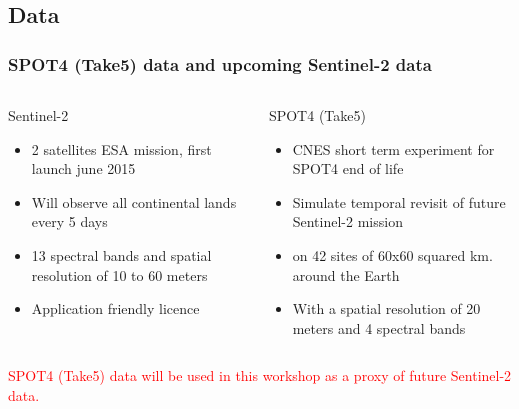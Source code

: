 \documentclass[8pt]{beamer}
\begin{document}
\subsection{Data}
\begin{frame}

\frametitle{SPOT4 (Take5) data and upcoming Sentinel-2 data}

\begin{columns}[t]
\begin{column}{5cm}
\begin{block}{Sentinel-2}
\begin{itemize}
\item 2 satellites ESA mission, first launch june 2015
\item Will observe all continental lands every 5 days
\item 13 spectral bands and spatial resolution of 10 to 60 meters
\item Application friendly licence
\end{itemize}
\end{block}
\end{column}
\begin{column}{5cm}
\begin{block}{SPOT4 (Take5)}
\begin{itemize}
\item CNES short term experiment for SPOT4 end of life
\item Simulate temporal revisit of future Sentinel-2 mission
\item on 42 sites of 60x60 squared km. around the Earth
\item With a spatial resolution of 20 meters and 4 spectral bands
\end{itemize}
\end{block}
\end{column}
\end{columns}

\textcolor{red}{SPOT4 (Take5) data will be used in this workshop as a proxy of future Sentinel-2 data.}

\end{frame}
\end{document}
